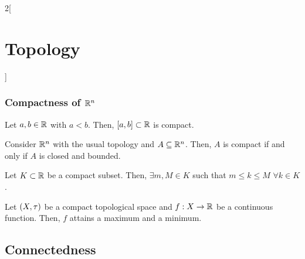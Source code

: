 \documentclass[../../../main.tex]{subfiles}
\begin{document}
\begin{multicols}{2}[\section{Topology}]
    \subsubsection{Compactness of \texorpdfstring{$\mathbb{R}^n$}{Rn}}
    \begin{theorem}
        Let $a,b\in\mathbb{R}$ with $a<b$. Then, $[a,b]\subset\mathbb{R}$ is compact.
    \end{theorem}
    \begin{theorem}
        Consider $\mathbb{R}^n$ with the usual topology and $A\subseteq \mathbb{R}^n$. Then, $A$ is compact if and only if $A$ is closed and bounded.
    \end{theorem}
    \begin{lemma}
        Let $K\subset\mathbb{R}$ be a compact subset. Then, $\exists m,M\in K$ such that $m\leq k\leq M$ $\forall k\in K$.
    \end{lemma}
    \begin{theorem}
        Let $(X,\tau)$ be a compact topological space and $f:X\rightarrow\mathbb{R}$ be a continuous function. Then, $f$ attains a maximum and a minimum.
    \end{theorem}
    \subsection{Connectedness}

\end{multicols}
\end{document}
